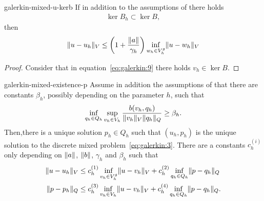 \begin{Corollary}{galerkin-mixed-u-kerb}
  If in addition to the assumptions of
   there holds
  \begin{gather}
    \label{eq:galerkin:6}
    \ker{B_h}\subset \ker B,
  \end{gather}
  then
  \begin{gather}
    \label{eq:galerkin:7}
    \lVert u-u_h\rVert_V \le \left(1+\frac{\lVert a\rVert}{\gamma_h}\right)
    \inf_{w_h\in V_h^g}\lVert u-w_h\rVert_V
  \end{gather}
\end{Corollary}

\begin{proof}
  Consider that in equation~\eqref{eq:galerkin:9} there holds
  $v_h\in\ker B$.
\end{proof}

\begin{Theorem}{galerkin-mixed-existence-p}
  Assume in addition the assumptions of
   that there are constants
  $\beta_h$, possibly depending on the parameter $h$, such that
  \begin{gather}
    \label{eq:galerkin:10}
    \inf_{q_h\in Q_h} \sup_{v_h\in V_h}
    \frac{b(v_h, q_h)}{\lVert v_h\rVert_V\lVert q_h\rVert_Q}
    \ge \beta_h.
  \end{gather}
  Then,there is a unique solution $p_h\in Q_h$ such that $(u_h, p_h)$
  is the unique solution to the discrete mixed
  problem~\eqref{eq:galerkin:3}. There are a constants $c_h^{(i)}$
  only depending on $\lVert a\rVert$, $\lVert b\rVert$, $\gamma_h$ and $\beta_h$
  such that
  \begin{align}
    \label{eq:galerkin:11}
    \lVert u-u_h\rVert_V 
    &\le c_h^{(1)} \inf_{v_h\in V_h^g}\lVert u-v_h\rVert_V
    + c_h^{(2)} \inf_{q_h\in Q_h}\lVert p-q_h\rVert_Q \\
    \lVert p-p_h\rVert_Q
    &\le c_h^{(3)} \inf_{v_h\in V_h}\lVert u-v_h\rVert_V
    + c_h^{(4)} \inf_{q_h\in Q_h}\lVert p-q_h\rVert_Q.
  \end{align}
\end{Theorem}

